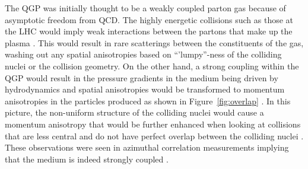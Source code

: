 %
%
%
%
%
%

The QGP was initially thought to be a weakly coupled parton gas because of asymptotic freedom from QCD.
The highly energetic collisions such as those at the LHC would imply weak interactions between the partons that make up the plasma \cite{PhysRevLett.34.1353, heinz2013collective, 10.1007/978-1-4020-2705-5_14}.
This would result in rare scatterings between the constituents of the gas, washing out any spatial anisotropies based on ``'lumpy''-ness of the colliding nuclei or the collision geometry.
On the other hand, a strong coupling within the QGP would result in the pressure gradients in the medium being driven by hydrodynamics and spatial anisotropies would be transformed to momentum anisotropies in the particles produced as shown in Figure~\ref{fig:overlap} \cite{Busza:2018rrf}.
In this picture, the non-uniform structure of the colliding nuclei would cause a momentum anisotropy \cite{Ster:1999ib} that would be further enhanced when looking at collisions that are less central and do not have perfect overlap between the colliding nuclei \cite{Poskanzer:1999ea, Pinkenburg:1999ya}.
These observations were seen in azimuthal correlation measurements implying that the medium is indeed strongly coupled \cite{Aaboud:2018ves, PhysRevLett.91.182301, Sirunyan:2017fts, PhysRevLett.116.132302}.

